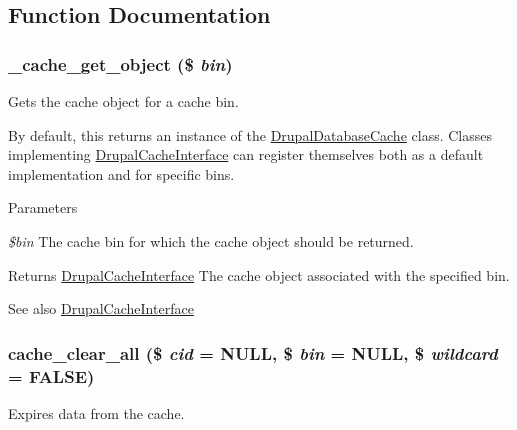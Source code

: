 \subsection{Function Documentation}
\hypertarget{includes_2cache_8inc_aebc44cd35cb38b264cf0b07a164ee1af}{
\subsubsection[{\_\-cache\_\-get\_\-object}]{\setlength{\rightskip}{0pt plus 5cm}\_\-cache\_\-get\_\-object (\$ {\em bin})}}
\label{includes_2cache_8inc_aebc44cd35cb38b264cf0b07a164ee1af}
Gets the cache object for a cache bin.

By default, this returns an instance of the \hyperlink{classDrupalDatabaseCache}{DrupalDatabaseCache} class. Classes implementing \hyperlink{interfaceDrupalCacheInterface}{DrupalCacheInterface} can register themselves both as a default implementation and for specific bins.


\begin{DoxyParams}{Parameters}
\item[{\em \$bin}]The cache bin for which the cache object should be returned. \end{DoxyParams}
\begin{DoxyReturn}{Returns}
\hyperlink{interfaceDrupalCacheInterface}{DrupalCacheInterface} The cache object associated with the specified bin.
\end{DoxyReturn}
\begin{DoxySeeAlso}{See also}
\hyperlink{interfaceDrupalCacheInterface}{DrupalCacheInterface} 
\end{DoxySeeAlso}
\hypertarget{includes_2cache_8inc_a409b34dd629640d791a11736a9de8125}{
\subsubsection[{cache\_\-clear\_\-all}]{\setlength{\rightskip}{0pt plus 5cm}cache\_\-clear\_\-all (\$ {\em cid} = {\ttfamily NULL}, \/  \$ {\em bin} = {\ttfamily NULL}, \/  \$ {\em wildcard} = {\ttfamily FALSE})}}
\label{includes_2cache_8inc_a409b34dd629640d791a11736a9de8125}
Expires data from the cache.


